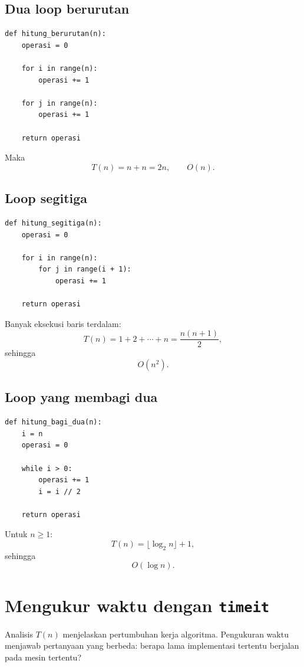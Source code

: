 \documentclass[11pt,a4paper]{report}
\begin{document}
\subsection{Dua loop berurutan}

\begin{lstlisting}
def hitung_berurutan(n):
    operasi = 0

    for i in range(n):
        operasi += 1

    for j in range(n):
        operasi += 1

    return operasi
\end{lstlisting}

Maka
\[
T(n)=n+n=2n,
\qquad
O(n).
\]

\subsection{Loop segitiga}

\begin{lstlisting}
def hitung_segitiga(n):
    operasi = 0

    for i in range(n):
        for j in range(i + 1):
            operasi += 1

    return operasi
\end{lstlisting}

Banyak eksekusi baris terdalam:
\[
T(n)=1+2+\cdots+n
    =\frac{n(n+1)}{2},
\]
sehingga
\[
O(n^2).
\]

\subsection{Loop yang membagi dua}

\begin{lstlisting}
def hitung_bagi_dua(n):
    i = n
    operasi = 0

    while i > 0:
        operasi += 1
        i = i // 2

    return operasi
\end{lstlisting}

Untuk $n\ge1$:
\[
T(n)=\lfloor\log_2 n\rfloor+1,
\]
sehingga
\[
O(\log n).
\]

\section{Mengukur waktu dengan \texttt{timeit}}

Analisis $T(n)$ menjelaskan pertumbuhan kerja algoritma. Pengukuran waktu menjawab pertanyaan
yang berbeda: berapa lama implementasi tertentu berjalan pada mesin tertentu?
\end{document}

